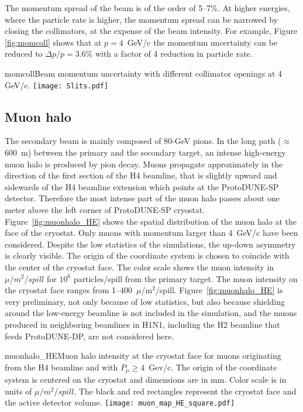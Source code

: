 The momentum spread of the beam is of the order of 5--7\%. At higher energies, where
the particle rate is higher, the momentum spread  can be narrowed by
closing the collimators, at the expense of the beam intensity.  For example, Figure \ref{fig:momcoll} shows
that at $p=4$~GeV/c the momentum uncertainty can be  reduced to $\Delta p/p= 3.6\%$ with a factor of 4 reduction in particle rate.  
\begin{cdrfigure}{momcoll}{Beam momentum uncertainty with different collimator openings at 4 GeV/c.}
  \texttt{[image: Slits.pdf]}
\end{cdrfigure}


\subsection{Muon halo}
The secondary beam is mainly composed of 80-GeV pions. In the long path ($\approx$ 600~m) between the primary and the secondary target,
 an intense high-energy muon halo is produced by pion decay. Muons propagate approximately in the direction of the first section of the H4 beamline,  that is slightly upward  and sidewards of the H4 beamline extension which points at the ProtoDUNE-SP detector.  
 Therefore the most intense part of the muon halo passes about one meter above the left corner of ProtoDUNE-SP cryostat. 
Figure~\ref{fig:muonhalo_HE} shows the spatial distribution of the muon halo at the face of the cryostat. Only muons with momentum larger than 4~GeV/c have been considered. Despite the low statistics of the simulations, the up-down asymmetry is clearly visible. The origin of the coordinate system is chosen to coincide with the center of the cryostat face. The color scale shows the muon intensity in $\mu /m^2/spill$ for $10^6$ particles/spill from the primary target. The muon intensity on the cryostat face ranges from 1--400~$\mu$/m$^2$/spill.
Figure~\ref{fig:muonhalo_HE}  is very preliminary, not only because of low statistics, but also because shielding around the low-energy beamline is not included in the simulation, and the muons produced in neighboring beamlines in H1N1, including the H2 beamline that feeds ProtoDUNE-DP, are not considered here. 
\begin{cdrfigure}{muonhalo_HE}{Muon halo intensity at the cryostat face for muons originating from the H4 beamline and with $P_\mu  \ge 4$~Gev/c. The origin of the coordinate system is centered on the cryostat and dimensions are in mm. Color scale is in units of $\mu /m^2/spill$. The black and red rectangles represent the cryostat face and the active detector volume.}
\texttt{[image: muon\_map\_HE\_square.pdf]}
\end{cdrfigure}




